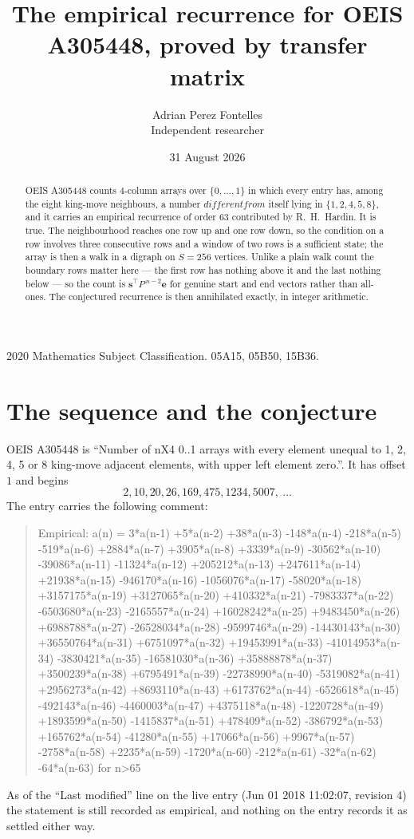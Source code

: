 \documentclass[11pt,a4paper]{article}
\title{The empirical recurrence for OEIS A305448, proved by transfer matrix}
\author{Adrian Perez Fontelles\\ \small Independent researcher}
\date{31 August 2026}
\theoremstyle{plain}
\theoremstyle{definition}
\begin{document}
\maketitle

\begin{abstract}
OEIS A305448 counts $4$-column arrays over $\{0,\dots,1\}$ in which every entry has,
among the eight king-move neighbours, a number $different from$ itself lying in $\{1,2,4,5,8\}$, and it carries an empirical
recurrence of order $63$ contributed by R.~H.~Hardin. It is true. The neighbourhood
reaches one row up and one row down, so the condition on a row involves three consecutive
rows and a window of two rows is a sufficient state; the array is then a walk in a digraph
on $S=256$ vertices. Unlike a plain walk count the boundary rows matter here --- the first
row has nothing above it and the last nothing below --- so the count is
$\mathbf{s}^{\!\top}P^{\,n-2}\mathbf{e}$ for genuine start and end vectors rather than
all-ones. The conjectured recurrence is then annihilated exactly, in integer arithmetic.
\end{abstract}

\noindent\small 2020 Mathematics Subject Classification. 05A15, 05B50, 15B36.\normalsize

\section{The sequence and the conjecture}

OEIS A305448 is ``Number of nX4 0..1 arrays with every element unequal to 1, 2, 4, 5 or 8 king-move adjacent elements, with upper left element zero.''. It has offset
$1$ and begins
\[
2, 10, 20, 26, 169, 475, 1234, 5007,\ \dots
\]
The entry carries the following comment:
\begin{quote}\small
Empirical: a(n) = 3*a(n-1) +5*a(n-2) +38*a(n-3) -148*a(n-4) -218*a(n-5) -519*a(n-6) +2884*a(n-7) +3905*a(n-8) +3339*a(n-9) -30562*a(n-10) -39086*a(n-11) -11324*a(n-12) +205212*a(n-13) +247611*a(n-14) +21938*a(n-15) -946170*a(n-16) -1056076*a(n-17) -58020*a(n-18) +3157175*a(n-19) +3127065*a(n-20) +410332*a(n-21) -7983337*a(n-22) -6503680*a(n-23) -2165557*a(n-24) +16028242*a(n-25) +9483450*a(n-26) +6988788*a(n-27) -26528034*a(n-28) -9599746*a(n-29) -14430143*a(n-30) +36550764*a(n-31) +6751097*a(n-32) +19453991*a(n-33) -41014953*a(n-34) -3830421*a(n-35) -16581030*a(n-36) +35888878*a(n-37) +3500239*a(n-38) +6795491*a(n-39) -22738990*a(n-40) -5319082*a(n-41) +2956273*a(n-42) +8693110*a(n-43) +6173762*a(n-44) -6526618*a(n-45) -492143*a(n-46) -4460003*a(n-47) +4375118*a(n-48) -1220728*a(n-49) +1893599*a(n-50) -1415837*a(n-51) +478409*a(n-52) -386792*a(n-53) +165762*a(n-54) -41280*a(n-55) +17066*a(n-56) +9967*a(n-57) -2758*a(n-58) +2235*a(n-59) -1720*a(n-60) -212*a(n-61) -32*a(n-62) -64*a(n-63) for n>65
\end{quote}
As of the ``Last modified'' line on the live entry (Jun 01 2018 11:02:07, revision
4) the statement is still recorded as empirical, and nothing on the entry
records it as settled either way.
\end{document}

